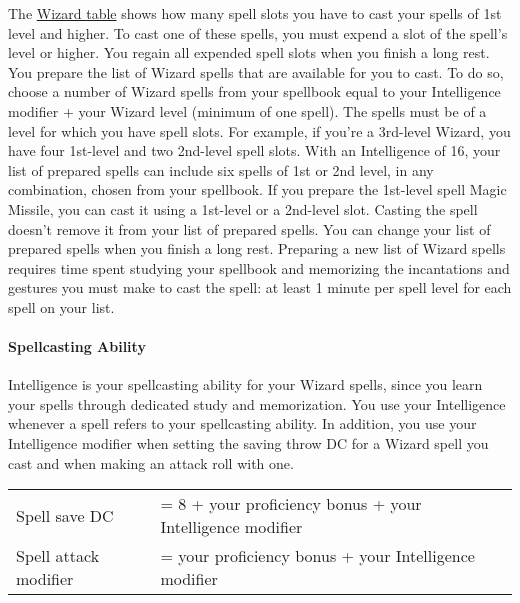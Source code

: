 The \hyperref[wizard-table]{Wizard table} shows how many spell slots you
have to cast your spells of 1st level and higher. To cast one of these
spells, you must expend a slot of the spell's level or higher. You
regain all expended spell slots when you finish a long rest. You prepare
the list of Wizard spells that are available for you to cast. To do so,
choose a number of Wizard spells from your spellbook equal to your
Intelligence modifier + your Wizard level (minimum of one spell). The
spells must be of a level for which you have spell slots. For example,
if you're a 3rd-level Wizard, you have four 1st-level and two 2nd-level
spell slots. With an Intelligence of 16, your list of prepared spells
can include six spells of 1st or 2nd level, in any combination, chosen
from your spellbook. If you prepare the 1st-level spell Magic Missile,
you can cast it using a 1st-level or a 2nd-level slot. Casting the spell
doesn't remove it from your list of prepared spells. You can change your
list of prepared spells when you finish a long rest. Preparing a new
list of Wizard spells requires time spent studying your spellbook and
memorizing the incantations and gestures you must make to cast the
spell: at least 1 minute per spell level for each spell on your list.

\paragraph{Spellcasting Ability}\label{_spellcasting_ability_2}

Intelligence is your spellcasting ability for your Wizard spells, since
you learn your spells through dedicated study and memorization. You use
your Intelligence whenever a spell refers to your spellcasting ability.
In addition, you use your Intelligence modifier when setting the saving
throw DC for a Wizard spell you cast and when making an attack roll with
one.

\begin{longtable}[]{@{}
  >{\raggedright\arraybackslash}p{}
  >{\raggedright\arraybackslash}p{}@{}}
\toprule\noalign{}
\endhead
\bottomrule\noalign{}
\endlastfoot
Spell save DC & = 8 + your proficiency bonus + your Intelligence
modifier \\
Spell attack modifier & = your proficiency bonus + your Intelligence
modifier \\
\end{longtable}

